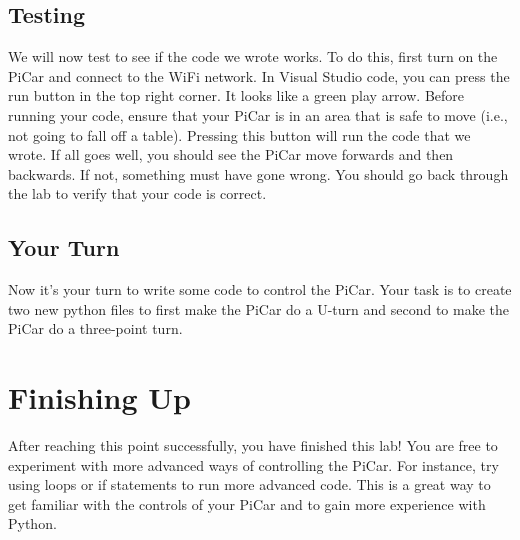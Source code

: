 \documentclass[11pt]{report}
\begin{document}
\section{Testing}


We will now test to see if the code we wrote works. To do this, first turn on the PiCar and connect to the WiFi network. In Visual Studio code, you can press the run button in the top right corner. It looks like a green play arrow. Before running your code, ensure that your PiCar is in an area that is safe to move (i.e., not going to fall off a table). Pressing this button will run the code that we wrote. If all goes well, you should see the PiCar move forwards and then backwards. If not, something must have gone wrong. You should go back through the lab to verify that your code is correct.

\section{Your Turn}

Now it's your turn to write some code to control the PiCar. Your task is to create two new python files to first make the PiCar do a U-turn and second to make the PiCar do a three-point turn.

\chapter{Finishing Up}
After reaching this point successfully, you have finished this lab! You are free to experiment with more advanced ways of controlling the PiCar. For instance, try using loops or if statements to run more advanced code. This is a great way to get familiar with the controls of your PiCar and to gain more experience with Python.
\end{document}
